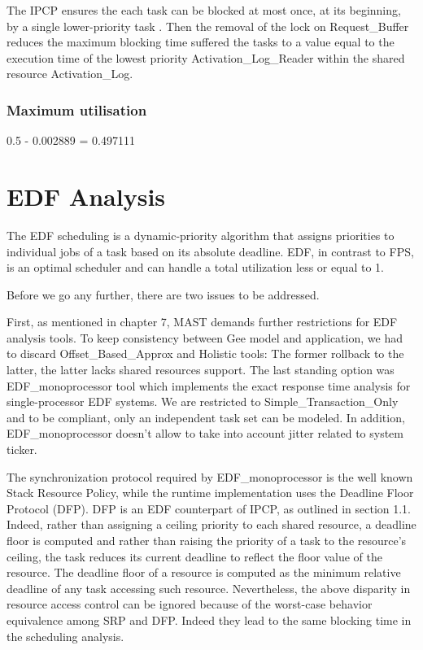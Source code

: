 \documentclass{article}
\begin{document}
The IPCP ensures the each task can be blocked at most once, at its beginning, by a single lower-priority task \cite{ada-pcp}. Then the removal of the lock on Request\_Buffer reduces the maximum blocking time suffered the tasks to a value equal to the execution time of the lowest priority Activation\_Log\_Reader within the shared resource Activation\_Log.

\subsubsection{Maximum utilisation}

0.5 - 0.002889 = 0.497111

\section{EDF Analysis}

The EDF scheduling is a dynamic-priority algorithm that assigns priorities to individual jobs of a task based on its absolute deadline.
EDF, in contrast to FPS, is an optimal scheduler and can handle a total utilization less or equal to 1.

Before we go any further, there are two issues to be addressed.

First, as mentioned in chapter 7, MAST demands further restrictions for EDF analysis tools.
To keep consistency between Gee model and application, we had to discard Offset\_Based\_Approx and Holistic tools:
The former rollback to the latter, the latter lacks shared resources support.
The last standing option was EDF\_monoprocessor tool which implements the exact response time analysis for single-processor EDF systems.
We are restricted to Simple\_Transaction\_Only and to be compliant, only an independent task set can be modeled.
In addition, EDF\_monoprocessor doesn't allow to take into account jitter related to system ticker.

The synchronization protocol required by EDF\_monoprocessor is the well known Stack Resource Policy, while the runtime implementation uses the Deadline Floor Protocol (DFP).
DFP is an EDF counterpart of IPCP, as outlined in section 1.1.
Indeed, rather than assigning a ceiling priority to each shared resource, a deadline floor is computed and rather than raising the priority of a task to the resource's ceiling,
the task reduces its current deadline to reflect the floor value of the resource.
The deadline floor of a resource is computed as the minimum relative deadline of any task accessing such resource.
Nevertheless, the above disparity in resource access control can be ignored because of the worst-case behavior equivalence among SRP and DFP.
Indeed they lead to the same blocking time in the scheduling analysis.
\end{document}
